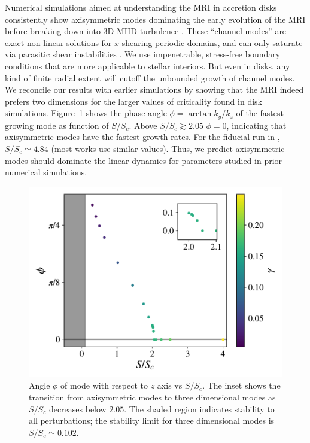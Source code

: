 \documentclass[aps,prl,reprint,superscriptaddress]{revtex4-1}
\newcommand{\SSC}{S/S_{c}}
\begin{document}
Numerical simulations aimed at understanding the MRI in accretion disks consistently show axisymmetric modes dominating the early evolution of the MRI before breaking down into 3D MHD turbulence \citep{1995ApJ...440..742H,2018ApJ...853..174H,2019ApJS..241...26D}. 
These ``channel modes'' are exact non-linear solutions for $x$-shearing-periodic domains, and can only saturate via parasitic shear instabilities \citep{1994ApJ...432..213G}.
We use impenetrable, stress-free boundary conditions that are more applicable to stellar interiors. 
But even in disks, any kind of finite radial extent will cutoff the unbounded growth of channel modes. 
We reconcile our results with earlier simulations by showing that the MRI indeed prefers two dimensions for the larger values of criticality found in disk simulations. 
Figure~\ref{fig:phi} shows the phase angle $\phi = \arctan k_y/k_z$ of the fastest growing mode as function of $\SSC$.
Above $\SSC \gtrsim 2.05$ $\phi=0$, indicating that axisymmetric modes have the fastest growth rates.
For the fiducial run in \citet{1996ApJ...464..690H}, $\SSC \simeq 4.84$ (most works use similar values).
Thus, we predict axisymmetric modes should dominate the linear dynamics for parameters studied in prior numerical simulations.
%
\begin{figure}[h!]
  \includegraphics[width=\columnwidth]{phi_vs_ssc_grid.pdf}
  \caption{Angle $\phi$ of mode with respect to $z$ axis vs $\SSC$. The inset shows the transition from axisymmetric modes to three dimensional modes as $\SSC$ decreases below $2.05$. The shaded region indicates stability to all perturbations; the stability limit for three dimensional modes is $\SSC \simeq 0.102$.}
  \label{fig:phi}
\end{figure}
%
\end{document}
